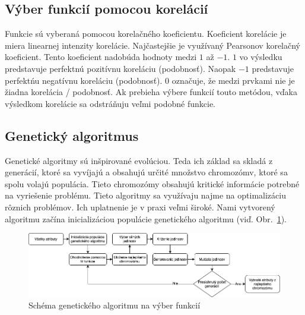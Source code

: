 \documentclass[runningheads]{llncs}
\begin{document}
\subsection{Výber funkcií pomocou korelácií}
Funkcie sú vyberaná pomocou korelačného koeficientu. Koeficient korelácie je miera linearnej intenzity 
korelácie. Najčastejšie je využívaný Pearsonov korelačný koeficient. Tento koeficient nadobúda hodnoty medzi
\begin{math}1\end{math} až \begin{math}-1\end{math}. \begin{math}1\end{math} vo výsledku predstavuje perfektnú pozitívnu 
koreláciu (podobnosť). Naopak \begin{math}-1\end{math} predstavuje 
perfektńu negatívnu koreláciu (podobnosť). \begin{math}0\end{math} označuje, že medzi prvkami nie je žiadna korelácia / podobnosť.
Ak prebieha výbere funkcií touto metódou, vďaka výsledkom korelácie sa odstráňuju veľmi podobné funkcie.\cite{ref_xu}

\subsection{Genetický algoritmus}

Genetické algoritmy sú inšpirované evolúciou. Teda ich základ sa skladá z generácií, ktoré sa vyvíjajú a obsahujú 
určité množstvo chromozómv, ktoré sa spolu volajú populácia. Tieto chromozómy obsahujú kritické informácie 
potrebné na vyriešenie problému. Tieto algoritmy sa využívaju najme na optimalizáciu rôznich
problémov. Ich uplatnenie je v praxi veľmi široké.\cite{ref_babatunde,ref_whitley} Nami vytvorený algoritmu začína 
inicializáciou populácie genetického algoritmu (viď. Obr.~\ref{fig_ga_rozdelenie}).
\begin{figure}
\includegraphics[width=\textwidth]{image/GA_alg.png}
\caption{Schéma genetického algoritmu na výber funkcií} \label{fig_ga_rozdelenie}
\end{figure}
    
\end{document}
